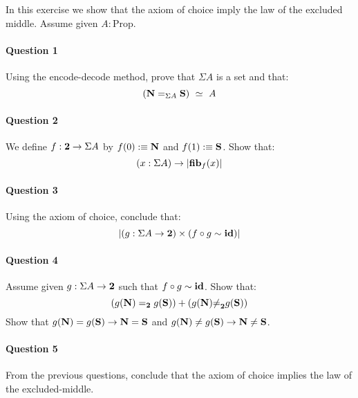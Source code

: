 \documentclass{article}[6pt]%
\renewcommand{\r}{\rightarrow}
\newcommand{\id}{\mathrm{\bf id}}
\newcommand{\fib}{\mathrm{\bf fib}}
\newcommand{\N}{\mathrm{\bf N}}
\renewcommand{\S}{\mathrm{\bf S}}
\newcommand{\two}{{\bf 2}}
\newcommand{\Prop}{\mathrm{Prop}}
\begin{document}
\begin{Exercise}[title={Diaconescu's theorem}]
In this exercise we show that the axiom of choice imply the law of the excluded middle. Assume given $A:\Prop$.

\paragraph{Question 1} Using the encode-decode method, prove that $\Sigma A$ is a set and that: 
\[(\N=_{\Sigma A} \S) \ \simeq\ A\]

\paragraph{Question 2} We define $f:\two \r \Sigma A$ by $f(0):\equiv \N$ and $f(1):\equiv \S$. Show that:
\[(x:\Sigma A) \r |\fib_f(x)|\]

\paragraph{Question 3} Using the axiom of choice, conclude that:
\[|(g:\Sigma A \r \two) \times (f\circ g \sim \id)|\]

\paragraph{Question 4} Assume given $g:\Sigma A \r \two$ such that $f\circ g \sim \id$. Show that:
\[(g(\N)=_\two g(\S))+(g(\N){\not=}_\two g(\S))\]
 Show that $g(\N)=g(\S)\r \N=\S$ and $g(\N)\not=g(\S) \r \N\not=\S$.


\paragraph{Question 5} From the previous questions, conclude that the axiom of choice implies the law of the excluded-middle.

\end{Exercise}
\end{document}
